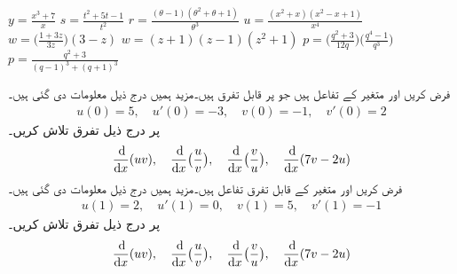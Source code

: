 $y=\tfrac{x^3+7}{x}$
$s=\tfrac{t^2+5t-1}{t^2}$
$r=\tfrac{(\theta-1)(\theta^2+\theta+1)}{\theta^3}$
$u=\tfrac{(x^2+x)(x^2-x+1)}{x^4}$
$w=\big(\tfrac{1+3z}{3z}\big)(3-z)$
$w=(z+1)(z-1)(z^2+1)$
$p=\big(\tfrac{q^2+3}{12q}\big)\big(\tfrac{q^4-1}{q^3}\big)$
$p=\tfrac{q^2+3}{(q-1)^3+(q+1)^3}$

فرض کریں  اور  متغیر  کے تفاعل ہیں جو  پر قابل تفرق ہیں۔مزید ہمیں درج ذیل معلومات دی گئی ہیں۔
\begin{align*}
u(0)=5,\quad u'(0)=-3,\quad v(0)=-1,\quad v'(0)=2
\end{align*}  
 پر درج ذیل تفرق تلاش کریں۔
\begin{align*}
\frac{\dif}{\dif x}(uv),\quad \frac{\dif}{\dif x}\big(\frac{u}{v}\big),\quad \frac{\dif}{\dif x}\big(\frac{v}{u}\big),\quad \frac{\dif}{\dif x}(7v-2u)
\end{align*}
فرض کریں   اور  متغیر  کے قابل تفرق تفاعل ہیں۔مزید ہمیں درج ذیل معلومات دی گئی ہیں۔
\begin{align*}
u(1)=2,\quad u'(1)=0,\quad v(1)=5,\quad v'(1)=-1
\end{align*}  
 پر درج ذیل تفرق تلاش کریں۔
\begin{align*}
\frac{\dif}{\dif x}(uv),\quad \frac{\dif}{\dif x}\big(\frac{u}{v}\big),\quad \frac{\dif}{\dif x}\big(\frac{v}{u}\big),\quad \frac{\dif}{\dif x}(7v-2u)
\end{align*}

